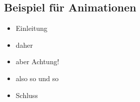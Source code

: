 \documentclass{beamer}
\begin{document}
	\subsection[Animation]{Beispiel für Animationen}
	\begin{frame}
		\begin{itemize}
			\item Einleitung
			\item<2-> daher
			\item<2-|alert@3-> aber Achtung!
			\item<3-> also so und so
			\item<4-> Schluss
		\end{itemize}
	\end{frame}
	
\end{document}
